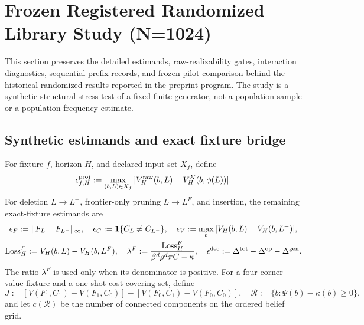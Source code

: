 \section{Frozen Registered Randomized Library Study (N=1024)}
\label{sec:supp-randomized-study}

\begin{center}
\end{center}

This section preserves the detailed estimands, raw-realizability gates,
interaction diagnostics, sequential-prefix records, and frozen-pilot
comparison behind the historical randomized results reported in the preprint
program. The
study is a synthetic structural stress test of a fixed finite generator, not a
population sample or a population-frequency estimate.

\subsection{Synthetic estimands and exact fixture bridge}
\label{sec:supp-synthetic-estimands}

For fixture \(f\), horizon \(H\), and declared input set \(X_f\), define
\[
 \epsilon^{\rm proj}_{f,H}
 :=\max_{(b,L)\in X_f}
   |V_H^{\rm raw}(b,L)-V_H^K(b,\phi(L))|.
\]
For deletion \(L\to L^-\), frontier-only pruning \(L\to L^F\), and insertion,
the remaining exact-fixture estimands are
\[
\begin{gathered}
 \epsilon_F:=\lVert F_L-F_{L^-}\rVert_\infty,\quad
 \epsilon_C:=\mathbf 1\{C_L\ne C_{L^-}\},\quad
 \epsilon_V:=\max_b|V_H(b,L)-V_H(b,L^-)|,\\
 \operatorname{Loss}_H^F:=V_H(b,L)-V_H(b,L^F),\quad
 \lambda^F:=
 \frac{\operatorname{Loss}_H^F}{\beta^d\rho^d\pi C-\kappa},\quad
 \epsilon^{\rm dec}:=
 \Delta^{\rm tot}-\Delta^{\rm op}-\Delta^{\rm gen}.
\end{gathered}
\]
The ratio \(\lambda^F\) is used only when its denominator is positive.  For a
four-corner value fixture and a one-shot cost-covering set, define
\[
 J:=[V(F_1,C_1)-V(F_1,C_0)]-[V(F_0,C_1)-V(F_0,C_0)],
 \quad
 \mathcal R:=\{b:\Psi(b)-\kappa(b)\ge0\},
\]
and let \(c(\mathcal R)\) be the number of connected components on the ordered
belief grid.

